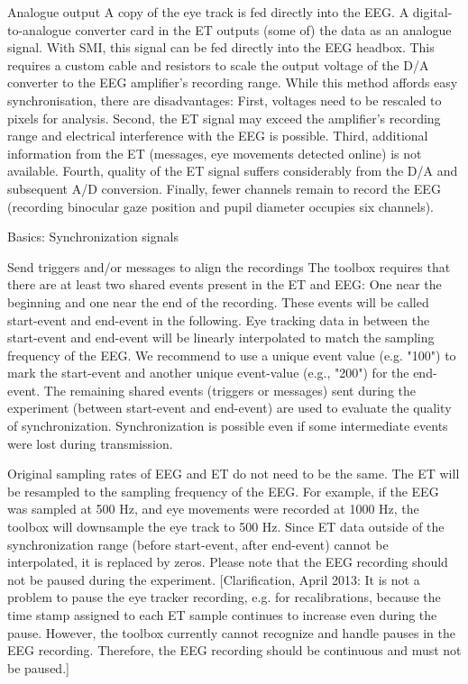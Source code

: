   Analogue output
  A copy of the eye track is fed directly into the EEG. A digital-to-analogue 
  converter card in the ET outputs (some of) the data as an analogue signal.
   With SMI, this signal can be fed directly into the EEG headbox. 
   This requires a custom cable and resistors to scale the output voltage 
   of the D/A converter to the EEG amplifier's recording range. While this
    method affords easy synchronisation, there are disadvantages: First, 
    voltages need to be rescaled to pixels for analysis. Second, the ET 
    signal may exceed the amplifier’s recording range and electrical 
    interference with the EEG is possible. 
    Third, additional information from the ET 
    (messages, eye movements detected online) is 
    not available. Fourth, quality of the ET signal 
    suffers considerably from the D/A and subsequent 
    A/D conversion. Finally, fewer channels remain to record
     the EEG (recording binocular gaze position and pupil diameter occupies six channels).

     Basics: Synchronization signals

     Send triggers and/or messages to align the recordings
The toolbox requires that there are at least two shared events present in the ET and EEG: One near the beginning and one near the end of the recording. These events will be called start-event and end-event in the following. Eye tracking data in between the start-event and end-event will be linearly interpolated to match the sampling frequency of the EEG. We recommend to use a unique event value (e.g. "100") to mark the start-event and another unique event-value (e.g., "200") for the end-event. The remaining shared events (triggers or messages) sent during the experiment (between start-event and end-event) are used to evaluate the quality of synchronization. Synchronization is possible even if some intermediate events were lost during transmission.

Original sampling rates of EEG and ET do not need to be the same. The ET will be resampled to the sampling frequency of the EEG. For example, if the EEG was sampled at 500 Hz, and eye movements were recorded at 1000 Hz, the toolbox will downsample the eye track to 500 Hz. Since ET data outside of the synchronization range (before start-event, after end-event) cannot be interpolated, it is replaced by zeros. Please note that the EEG recording should not be paused during the experiment. [Clarification, April 2013: It is not a problem to pause the eye tracker recording, e.g. for recalibrations, because the time stamp assigned to each ET sample continues to increase even during the pause. However, the toolbox currently cannot recognize and handle pauses in the EEG recording. Therefore, the EEG recording should be continuous and must not be paused.]

